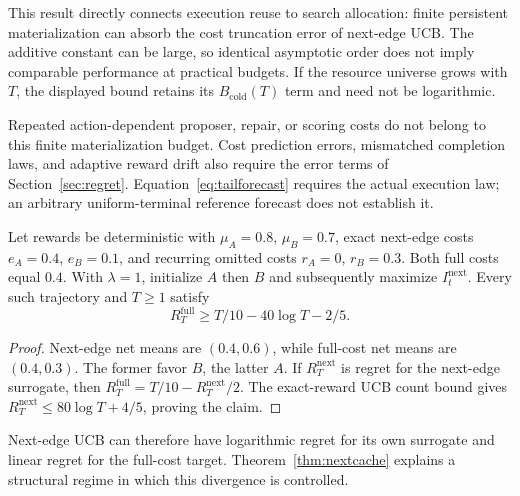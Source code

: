 This result directly connects execution reuse to search allocation: finite persistent materialization can absorb the cost truncation error of next-edge UCB. The additive constant can be large, so identical asymptotic order does not imply comparable performance at practical budgets. If the resource universe grows with $T$, the displayed bound retains its $B_{\mathrm{cold}}(T)$ term and need not be logarithmic.

Repeated action-dependent proposer, repair, or scoring costs do not belong to this finite materialization budget. Cost prediction errors, mismatched completion laws, and adaptive reward drift also require the error terms of Section~\ref{sec:regret}. Equation~\eqref{eq:tailforecast} requires the actual execution law; an arbitrary uniform-terminal reference forecast does not establish it.

\begin{theorem}
\label{thm:nextlinear}
Let rewards be deterministic with $\mu_A=0.8$, $\mu_B=0.7$, exact next-edge costs $e_A=0.4$, $e_B=0.1$, and recurring omitted costs $r_A=0$, $r_B=0.3$. Both full costs equal $0.4$. With $\lambda=1$, initialize $A$ then $B$ and subsequently maximize $I_t^{\mathrm{next}}$. Every such trajectory and $T\ge1$ satisfy
\begin{equation}
R_T^{\mathrm{full}}\ge T/10-40\log T-2/5.
\label{eq:nextlower}
\end{equation}
\end{theorem}
\begin{proof}
Next-edge net means are $(0.4,0.6)$, while full-cost net means are $(0.4,0.3)$. The former favor $B$, the latter $A$. If $R_T^{\mathrm{next}}$ is regret for the next-edge surrogate, then $R_T^{\mathrm{full}}=T/10-R_T^{\mathrm{next}}/2$. The exact-reward UCB count bound gives $R_T^{\mathrm{next}}\le80\log T+4/5$, proving the claim.
\end{proof}

Next-edge UCB can therefore have logarithmic regret for its own surrogate and linear regret for the full-cost target. Theorem~\ref{thm:nextcache} explains a structural regime in which this divergence is controlled.
